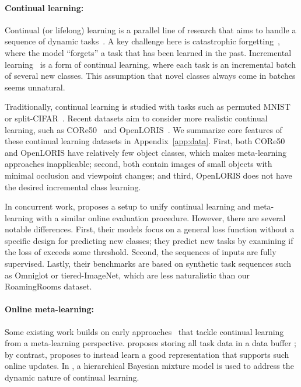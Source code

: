 \vspace{-0.1in}
\paragraph{Continual learning:} Continual (or lifelong) learning is a parallel line of research that
aims to handle a sequence of dynamic tasks~\citep{ewc,lwf,gem,expandable}. A key challenge here is
catastrophic forgetting~\citep{mccloskey1989catastrophic}, where the model ``forgets'' a task that
has been learned in the past. Incremental learning~\citep{icarl,eeil,bic,rebalance,inconline} is a
form of continual learning, where each task is an incremental batch of several new classes. This
assumption that novel classes always come in batches seems unnatural.

Traditionally, continual learning is studied with tasks such as permuted MNIST~\citep{mnist} or
split-CIFAR~\citep{cifar}. Recent datasets aim to consider more realistic continual learning, such as
CORe50~\citep{core50} and OpenLORIS~\citep{openloris}. We summarize core features of these continual
learning datasets in Appendix~\ref{app:data}. First, both CORe50 and OpenLORIS have relatively few object
classes, which makes meta-learning approaches inapplicable; second, both contain images of
small objects with minimal occlusion and viewpoint changes; and third, OpenLORIS does not have the
desired incremental class learning.

In concurrent work, \citet{osaka} proposes a setup to unify continual learning and meta-learning with
a similar online evaluation procedure. However, there are several notable differences. First, their
models focus on a general loss function without a specific design for predicting new classes; they
predict new tasks by examining if the loss of %
exceeds some threshold.
Second, the sequences of inputs are fully supervised. %
Lastly, their benchmarks are based on synthetic task sequences such as Omniglot or tiered-ImageNet, which are less naturalistic than our RoamingRooms dataset.

\vspace{-0.1in}
\paragraph{Online meta-learning:}
Some existing work builds on early approaches~\citep{thrun,Schmidhuber1987evolutionary} that tackle
continual learning from a meta-learning perspective. \citet{onlinemeta} proposes storing all task
data in a data buffer%
; by contrast, \citet{oml} proposes to
instead learn a good representation that
supports such online updates. In \citet{onlinemixture}, a hierarchical Bayesian mixture model is used
to address the dynamic nature of continual learning. 

